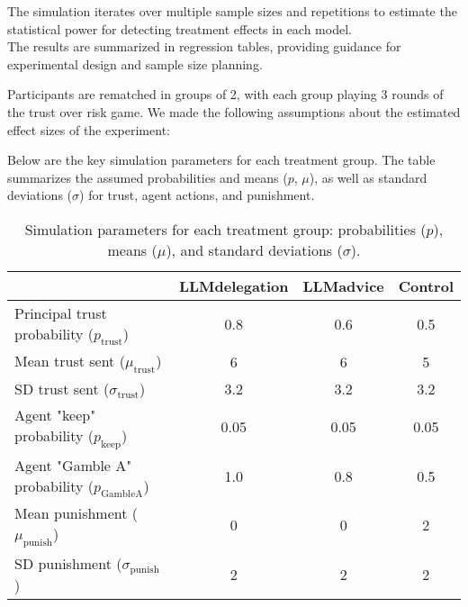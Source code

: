 \documentclass[
]{article}
\begin{document}
The simulation iterates over multiple sample sizes and repetitions to
estimate the statistical power for detecting treatment effects in each
model.\\
The results are summarized in regression tables, providing guidance for
experimental design and sample size planning.

Participants are rematched in groups of 2, with each group playing 3
rounds of the trust over risk game. We made the following assumptions
about the estimated effect sizes of the experiment:

Below are the key simulation parameters for each treatment group. The
table summarizes the assumed probabilities and means (\(p\), \(\mu\)),
as well as standard deviations (\(\sigma\)) for trust, agent actions,
and punishment.

\begin{table}[ht]
\centering
\begin{tabular}{lccc}
\toprule
 & \textbf{LLMdelegation} & \textbf{LLMadvice} & \textbf{Control} \\
\midrule
Principal trust probability ($p_\text{trust}$) & 0.8 & 0.6 & 0.5 \\
Mean trust sent ($\mu_\text{trust}$) & 6 & 6 & 5 \\
SD trust sent ($\sigma_\text{trust}$) & 3.2 & 3.2 & 3.2 \\
Agent "keep" probability ($p_\text{keep}$) & 0.05 & 0.05 & 0.05 \\
Agent "Gamble A" probability ($p_\text{GambleA}$) & 1.0 & 0.8 & 0.5 \\
Mean punishment ($\mu_\text{punish}$) & 0 & 0 & 2 \\
SD punishment ($\sigma_\text{punish}$) & 2 & 2 & 2 \\
\bottomrule
\end{tabular}
\caption{Simulation parameters for each treatment group: probabilities ($p$), means ($\mu$), and standard deviations ($\sigma$).}
\end{table}
\end{document}
